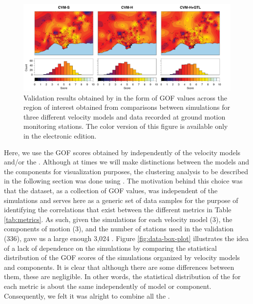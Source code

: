 \begin{figure}[t]
    \centering
    \includegraphics[width=\textwidth]{figures/pdf/figure-02}
    \caption{Validation results obtained by \citet{Taborda_2014_BSSA} in the form of GOF values across the region of interest obtained from comparisons between simulations for three different velocity models and data recorded at ground motion monitoring stations. The color version of this figure is available only in the electronic edition.}
    \label{fig:ref-gof-maps}
\end{figure}

Here, we use the GOF scores obtained by \citet{Taborda_2014_BSSA} independently of the velocity models and/or the .  Although at times we will make distinctions between the models and the components for visualization purposes, the clustering analysis to be described in the following section was done using . The motivation behind this choice was that the dataset, as a collection of GOF values, was independent of the simulations and serves here as a generic set of data samples for the purpose of identifying the correlations that exist between the different metrics in Table \ref{tab:metrics}. As such, given the simulations for each velocity model (3), the components of motion (3), and the number of stations used in the validation (336), gave us a large enough  3,024 . Figure \ref{fig:data-box-plot} illustrates the idea of a lack of dependence on the simulations by comparing the statistical distribution of the GOF scores of the simulations organized by velocity models and components. It is clear that although there are some differences between them, these are negligible. In other words, the statistical distribution of the  for each metric is about the same independently of model or component. Consequently, we felt it was alright to combine all the .

